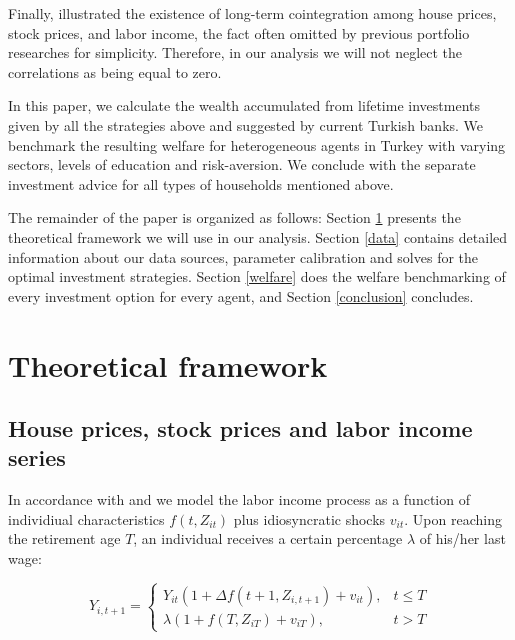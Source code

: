 \documentclass[]{elsarticle}
\begin{document}
Finally, \citet{ascheberg} illustrated the existence of long-term cointegration among house prices, stock prices, and labor income, the fact often omitted by previous portfolio researches for simplicity. Therefore, in our analysis we will not neglect the correlations as being equal to zero. 

In this paper, we calculate the wealth accumulated from lifetime investments given by all the strategies above and suggested by current Turkish banks. We benchmark the resulting welfare for heterogeneous agents in Turkey with varying sectors, levels of education and risk-aversion. We conclude with the separate investment advice for all types of households mentioned above.

The remainder of the paper is organized as follows: Section \ref{model} presents the theoretical framework we will use in our analysis. Section \ref{data} contains detailed information about our data sources, parameter calibration and solves for the optimal investment strategies. Section \ref{welfare} does the welfare benchmarking of every investment option for every agent, and Section \ref{conclusion} concludes.


\section{Theoretical framework}
\label{model}

\subsection{House prices, stock prices and labor income series}
In accordance with \citet{ccgm} and \citet{olear} we model the labor income process as a function of individiual characteristics $f(t, Z_{it})$ plus idiosyncratic shocks $v_{it}$. Upon reaching the retirement age $T$, an individual receives a certain percentage $\lambda$ of his/her last wage:

\begin{equation}
	Y_{i,t+1} = 
	\begin{cases}
		Y_{it} (1 + \Delta f(t+1,Z_{i,t+1}) + v_{it}), 	& t \leq T \\
		\lambda (1 + f(T, Z_{iT}) + v_{iT}), 			& t > T
	\end{cases}	
\end{equation}
\end{document}
